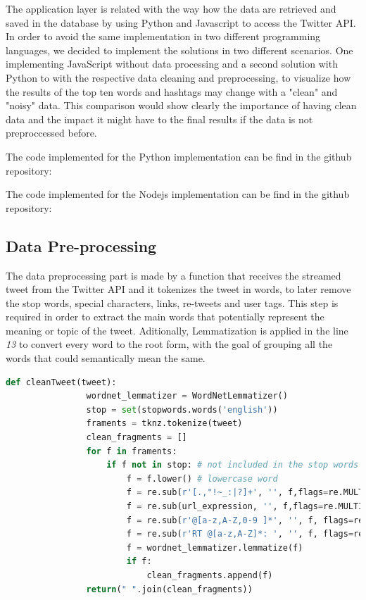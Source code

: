 \documentclass{article}
\begin{document}
        The application layer is related with the way how the data are retrieved and saved in the database by using Python and Javascript to access the Twitter API. In order to avoid the same implementation in two different programming languages,
        we decided to implement the solutions in two different scenarios. One implementing JavaScript without data processing and a second solution with Python to with the respective data cleaning and preprocessing, to
        visualize how the results of the top ten words and hashtags may change with a "clean" and "noisy" data. This comparison would show clearly the importance of having clean data and the impact it might have to the final results if the data is not preproccessed before.

        The code implemented for the Python implementation can be find in the github repository: %

        The code implemented for the Nodejs implementation can be find in the github repository: %

        \subsection{Data Pre-processing}

        The data preprocessing part is made by a function that receives the streamed tweet from the Twitter API and it tokenizes the tweet in words, to later remove the stop words, special characters, links, re-tweets and user tags. This step is required in order to extract the main words that potentially represent the meaning or topic of the tweet. Aditionally, Lemmatization is applied in the line \textit{13} to convert every word to the root 
        form, with the goal of grouping all the words that could semantically mean the same.
        \begin{lstlisting}[language=Python, caption= Tweet cleaning function, label={lst:dataCleaning}]
            def cleanTweet(tweet):    
                wordnet_lemmatizer = WordNetLemmatizer()
                stop = set(stopwords.words('english'))
                framents = tknz.tokenize(tweet)
                clean_fragments = []
                for f in framents:
                    if f not in stop: # not included in the stop words
                        f = f.lower() # lowercase word
                        f = re.sub(r'[.,"!~_:|?]+', '', f,flags=re.MULTILINE)
                        f = re.sub(url_expression, '', f,flags=re.MULTILINE) 
                        f = re.sub(r'@[a-z,A-Z,0-9 ]*', '', f, flags=re.MULTILINE) 
                        f = re.sub(r'RT @[a-z,A-Z]*: ', '', f, flags=re.MULTILINE) 
                        f = wordnet_lemmatizer.lemmatize(f)
                        if f:
                            clean_fragments.append(f)
                return(" ".join(clean_fragments))
        \end{lstlisting}
\end{document}
